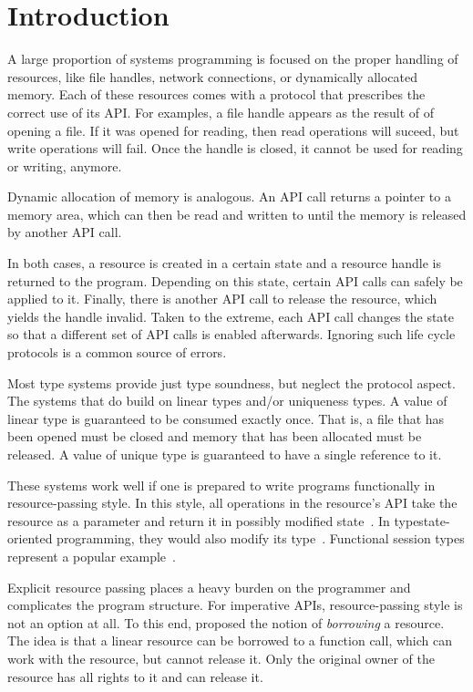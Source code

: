 \section{Introduction}

A large proportion of systems programming is focused on the proper
handling of resources, like file handles, network connections, or
dynamically allocated memory. Each of these resources comes with a
protocol that prescribes the correct use of its API.
For examples, a file handle appears as the result of of opening a
file. If it was opened for reading, then read operations will suceed,
but write operations will fail. Once the handle is closed, it cannot
be used for reading or writing, anymore.

Dynamic allocation of memory is analogous. An API call returns a
pointer to a memory area, which can then be read and written to until
the memory is released by another API call.

In both cases, a resource is created in a certain state and a resource
handle is returned to the program. Depending on this state, certain API calls
can safely be applied to it. Finally, there is another API call to
release the resource, which yields the handle invalid.
Taken to the extreme, each API call changes the state so that a
different set of API calls is enabled afterwards. 
Ignoring such life cycle protocols is a common source of errors.


Most type systems provide just type soundness, but neglect the
protocol aspect. The systems that do build on linear types \cite{Girard} and/or
uniqueness types\cite{DBLP:conf/plilp/BarendsenS95}. A value of linear
type is guaranteed to be consumed 
exactly once. That is, a file that has been opened must be closed and
memory that has been allocated must be released. A value of unique
type is guaranteed to have a single reference to it.

These systems work well if one is prepared to write programs
functionally in resource-passing style. In this style, all operations
in the resource's API take the resource as a parameter and return it
in possibly modified state~\cite{DBLP:journals/jfp/AchtenP95}. In
typestate-oriented programming, they would also modify its
type~\cite{DBLP:conf/oopsla/AldrichSSS09}. Functional session types 
represent a popular example~\cite{DBLP:journals/jfp/GayV10}. 

Explicit resource passing places a heavy burden on the programmer and
complicates the program structure. For imperative APIs,
resource-passing style is not an option at all. To this end,
\citet{DBLP:conf/popl/BoylandR05}  proposed the notion of
\emph{borrowing} a resource. The idea is that a linear resource can be
borrowed to a function call, which can work with the resource, but
cannot release it. Only the original owner of the resource has all
rights to it and can release it.

